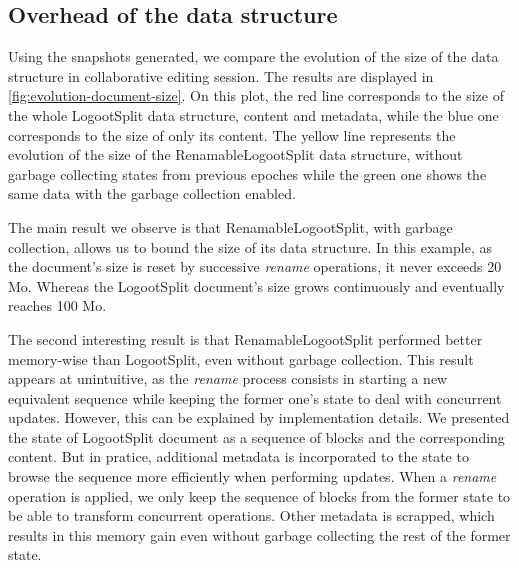 \documentclass{article}
\theoremstyle{definition}
\begin{document}
\subsection{Overhead of the data structure}

Using the snapshots generated, we compare the evolution of the size of the data structure in collaborative editing session.
The results are displayed in \autoref{fig:evolution-document-size}.
On this plot, the red line corresponds to the size of the whole LogootSplit data structure, content and metadata, while the blue one corresponds to the size of only its content.
The yellow line represents the evolution of the size of the RenamableLogootSplit data structure, without garbage collecting states from previous epoches while the green one shows the same data with the garbage collection enabled.

The main result we observe is that RenamableLogootSplit, with garbage collection, allows us to bound the size of its data structure.
In this example, as the document's size is reset by successive \emph{rename} operations, it never exceeds 20 Mo.
Whereas the LogootSplit document's size grows continuously and eventually reaches 100 Mo.

The second interesting result is that RenamableLogootSplit performed better memory-wise than LogootSplit, even without garbage collection.
This result appears at unintuitive, as the \emph{rename} process consists in starting a new equivalent sequence while keeping the former one's state to deal with concurrent updates.
However, this can be explained by implementation details.
We presented the state of LogootSplit document as a sequence of blocks and the corresponding content.
But in pratice, additional metadata is incorporated to the state to browse the sequence more efficiently when performing updates.
When a \emph{rename} operation is applied, we only keep the sequence of blocks from the former state to be able to transform concurrent operations.
Other metadata is scrapped, which results in this memory gain even without garbage collecting the rest of the former state.


\end{document}
